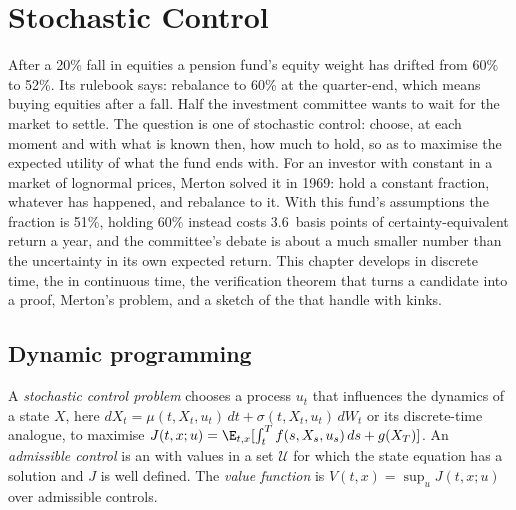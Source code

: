\chapter{Stochastic Control}\label{ch:qm:stochastic-control}

After a 20\% fall in equities a pension fund's equity weight has drifted from 60\% to 52\%. Its
rulebook says: rebalance to 60\% at the quarter-end, which means buying equities after a fall. Half
the investment committee wants to wait for the market to settle. The question is one of stochastic
control: choose, at each moment and with what is known then, how much to hold, so as to maximise the
expected utility of what the fund ends with. For an investor with constant  in a
market of lognormal prices, Merton solved it in 1969: hold a constant fraction, whatever has happened,
and rebalance to it. With this fund's assumptions the fraction is 51\%, holding 60\% instead costs
3.6~basis points of certainty-equivalent return a year, and the committee's debate is about a much
smaller number than the uncertainty in its own expected return. This chapter develops  in discrete time, the  in continuous time, the
verification theorem that turns a candidate into a proof, Merton's problem, and a sketch of the
 that handle  with kinks.

\section{Dynamic programming}

\begin{definition}\label{def:qm:stochastic-control:problem}
A \emph{stochastic control problem} chooses a process $u_t$ that
influences the dynamics of a state $X$, here $dX_t = \mu(t, X_t, u_t)\,dt + \sigma(t, X_t, u_t)\,dW_t$ or its
discrete-time analogue, to maximise $J(t, x; u) = \E_{t,x}[\int_t^Tf(s, X_s, u_s)\,ds + g(X_T)]$. An
\emph{admissible control} is an  with values in a set $\mathcal U$ for
which the state equation has a solution and $J$ is well defined. The \emph{value function} is $V(t, x) = \sup_uJ(t, x; u)$ over admissible controls.
\end{definition}

